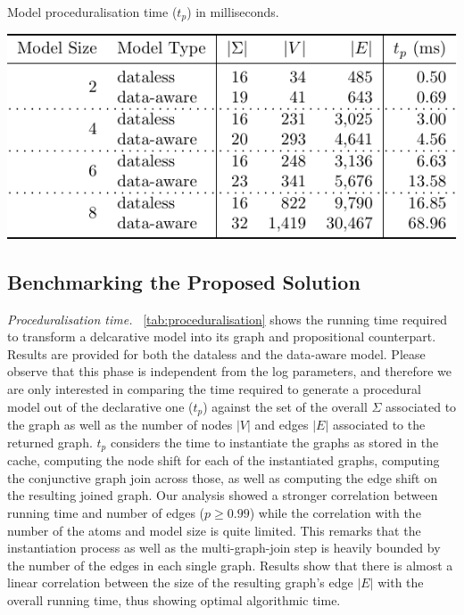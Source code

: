 \documentclass[sigconf]{acmart}
\begin{document}
\begin{table}[!t]
\centering
\caption{Model proceduralisation time ($t_p$) in milliseconds.}\label{tab:proceduralisation}
\includegraphics[scale=.8]{fig/tabmod}
\end{table}
\subsection{Benchmarking the Proposed Solution}\label{ssec:proposed}


\textit{Proceduralisation time.} \tablename~\ref{tab:proceduralisation} shows the running time required to transform a delcarative model into its graph and propositional counterpart. Results are provided for both the dataless and the data-aware model. Please observe that this phase is independent from the log parameters, and therefore we are only interested in comparing the time required to generate a procedural model out of the declarative one ($t_p$) against the set of the overall $\Sigma$ associated to the graph as well as the number of nodes $|V|$ and edges $|E|$ associated to the returned graph. $t_p$ considers the time to instantiate the graphs as stored in the cache, computing the node shift for each of the instantiated graphs, computing the conjunctive graph join across those, as well as computing the edge shift on the resulting joined graph. Our analysis showed a stronger correlation between running time and number of edges ($p\geq 0.99$) while the correlation with the number of the atoms and model size is quite limited. This remarks that the instantiation process as well as the multi-graph-join step is heavily bounded by the number of the edges in each single graph. Results show that there is almost a linear correlation between the size of the resulting graph's edge $|E|$ with the overall running time, thus showing optimal algorithmic time.\medskip
\end{document}
